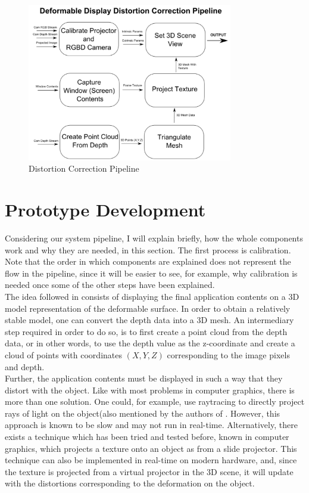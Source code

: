 \documentclass[]{article}
\begin{document}
\begin{figure}[hbtp]
    \centering
    \includegraphics[width=0.8\textwidth]{figures/DeformableDisplayPipeline.PNG}
    \caption{Distortion Correction Pipeline}
    \label{fig:Pipeline}
\end{figure}
\newpage
\section{Prototype Development}

Considering our system pipeline, I will explain briefly, how the whole components work and why they are needed, in this section. The first process is calibration. Note that the order in which components are explained does not represent the flow in the pipeline, since it will be easier to see, for example, why calibration is needed once some of the other steps have been explained.\\

The idea followed in \cite{watanabe08} consists of displaying the final application contents on a 3D model representation of the deformable surface. In order to obtain a relatively stable model, one can convert the depth data into a 3D mesh. An intermediary step required in order to do so, is to first create a point cloud from the depth data, or in other words, to use the depth value as the z-coordinate and create a cloud of points with coordinates $(X, Y, Z)$ corresponding to the image pixels and depth.\\

Further, the application contents must be displayed in such a way that they distort with the object. Like with most problems in computer graphics, there is more than one solution. One could, for example, use raytracing to directly project rays of light on the object(also mentioned by the authors of \cite{raskar98}. However, this approach is known to be slow and may not run in real-time. Alternatively, there exists a technique which has been tried and tested before, known in computer graphics, which projects a texture onto an object as from a slide projector. This technique can also be implemented in real-time on modern hardware, and, since the texture is projected from a virtual projector in the 3D scene, it will update with the distortions corresponding to the deformation on the object.\\
\end{document}
